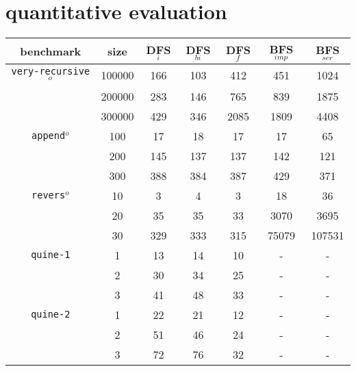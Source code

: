 \documentclass[acmlarge, review=true]{acmart}
\newcommand{\veryrecursiveo}{\texttt{very-recursive$^o$}}
\newcommand{\appendo}{\texttt{append$^o$}}
\newcommand{\reverso}{\texttt{revers$^o$}}
\newcommand{\DFSi }[0]{DFS$_{i}$}
\newcommand{\DFSf }[0]{DFS$_{f}$}
\newcommand{\DFSbi}[0]{DFS$_{bi}$}
\newcommand{\BFSser}[0]{BFS$_{ser}$}
\newcommand{\BFSimp}[0]{BFS$_{imp}$}
\begin{document}
\section{quantitative evaluation}
\label{sec:quan}

\begin{table}
	\begin{tabular}{|c|c|c|c|c|c|c|}
		\hline 
	benchmark & size & \DFSi & \DFSbi & \DFSf & \BFSimp{} & \BFSser{} \\
		\hline
		\veryrecursiveo & 100000 & 166 & 103 & 412 &   451 &   1024 \\
	    				& 200000 & 283 & 146 & 765 &   839 &   1875 \\
						& 300000 & 429 & 346 &2085 &  1809 &   4408 \\
		\hline  
		\appendo        & 	 100 &  17 &  18 &  17 &    17 &     65 \\
		         	  	& 	 200 & 145 & 137 & 137 &   142 &    121 \\
          		      	&	 300 & 388 & 384 & 387 &   429 &    371 \\
		\hline 
		\reverso		& 	  10 &   3 &   4 &   3 &    18 &     36 \\
						& 	  20 &  35 &  35 &  33 &  3070 &   3695 \\
						& 	  30 & 329 & 333 & 315 & 75079 & 107531 \\
		\hline
	\texttt{quine-1}	& 1 & 13 & 14 & 10 & - & - \\
						& 2 & 30 & 34 & 25 & - & - \\
						& 3 & 41 & 48 & 33 & - & - \\
		\hline
	\texttt{quine-2}	& 1 & 22 & 21 & 12 & - & - \\
						& 2 & 51 & 46 & 24 & - & - \\
						& 3 & 72 & 76 & 32 & - & - \\
		\hline

\end{tabular}
\end{table}
\end{document}
